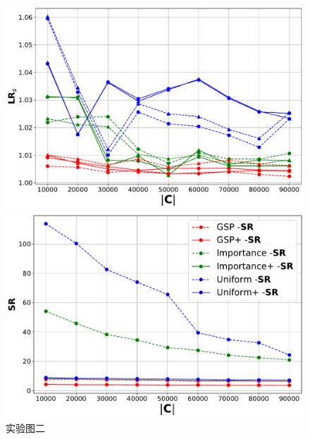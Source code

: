 \begin{figure}[!htbp]
\begin{minipage}{0.45\linewidth}
        \centering
        \includegraphics[width=\linewidth]{./fig/loss_ratio(0.01,0.0001) - USCensus.pdf}
    \end{minipage}
    \hfill
    \begin{minipage}{0.45\linewidth}
        \centering
        \includegraphics[width=\linewidth]{./fig/time_ratio(0.01,0.0001) - USCensus.pdf}
    \end{minipage}
    
    \caption{实验图二}
\end{figure}


